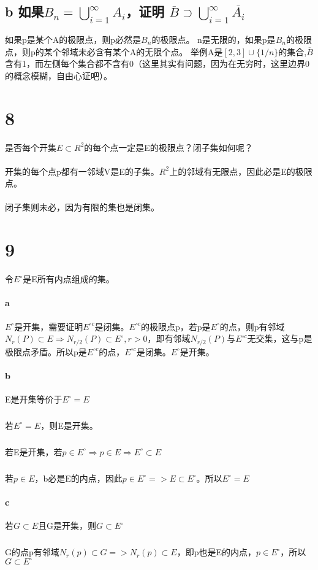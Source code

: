 \subsection*{b 如果$ B_n = \bigcup_{i=1}^{\infty}A_i$，证明 $\overline{B} \supset \bigcup_{i=1}^{\infty}\overline{A_i} $}
如果p是某个A的极限点，则p必然是$B_n$的极限点。
n是无限的，如果p是$B_n$的极限点，则p的某个邻域未必含有某个A的无限个点。
举例A是$[2,3] \cup \{1/n\}$的集合,$\overline{B}$含有1，而左侧每个集合都不含有0（这里其实有问题，因为在无穷时，这里边界0的概念模糊，自由心证吧）。
\section*{8} 是否每个开集$E \subset R^2 $的每个点一定是E的极限点？闭子集如何呢？
\paragraph{}开集的每个点p都有一邻域V是E的子集。$R^2$上的邻域有无限点，因此必是E的极限点。
\paragraph{}闭子集则未必，因为有限的集也是闭集。
\section*{9}令$E^{\circ}$是E所有内点组成的集。
\paragraph{a}$E^{\circ}$是开集，需要证明$E^{\circ c}$是闭集。$E^{\circ c}$的极限点p，若p是$E^{\circ}$的点，则p有邻域$N_r(P) \subset E \Rightarrow N_{r/2}(P) \subset E^{\circ}, r > 0$，即有邻域$N_{r/2}(P)$与$E^{\circ c}$无交集，这与p是极限点矛盾。所以p是$E^{\circ c}$的点，$E^{\circ c}$是闭集。$E^{\circ}$是开集。
\paragraph{b} E是开集等价于$E^{\circ} = E$
\subparagraph{}若$E^{\circ} = E$，则E是开集。
\subparagraph{}若E是开集，若$p \in E^{\circ} \Rightarrow p \in E \Rightarrow  E^{\circ} \subset E$
\subparagraph{}若$p \in E$，b必是E的内点，因此$p \in E^{\circ} => E \subset E^{\circ}$。所以$ E^{\circ} = E $
\paragraph{c} 若$G \subset E$且G是开集，则$G\subset E^{\circ}$
\subparagraph{} G的点p有邻域$N_r(p) \subset G => N_r(p) \subset E$，即p也是E的内点，$ p \in E^{\circ}$，所以$G\subset E^{\circ}$
